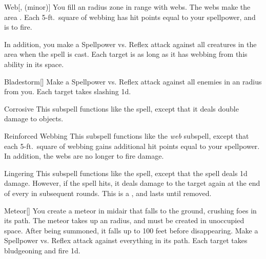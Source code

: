 \begin{ability}[\nth{2}]{Web}[,  (minor)]
You fill an \areasmall radius zone in \rngclose range with webs.
The webs make the area .
Each 5-ft.\ square of webbing has hit points equal to your spellpower, and is  to fire.

In addition, you make a Spellpower vs. Reflex attack against all creatures in the area when the spell is cast.
\hit Each target is \immobilized as long as it has webbing from this ability in its space.
\end{ability}
\vspace{0.25em}


\begin{ability}[\nth{3}]{Bladestorm}[]
Make a Spellpower vs. Reflex attack against all enemies in an \areasmall radius from you.
\hit Each target takes slashing  \minus1d.
\end{ability}
\vspace{0.25em}


\begin{ability}[\nth{3}]{Corrosive}
This subspell functions like the  spell, except that it deals double damage to objects.
\end{ability}
\vspace{0.25em}


\begin{ability}[\nth{4}]{Reinforced Webbing}
This subspell functions like the \textit{web} subspell, except that each 5-ft.\ square of webbing gains additional hit points equal to your spellpower.
In addition, the webs are no longer  to fire damage.
\end{ability}
\vspace{0.25em}


\begin{ability}[\nth{5}]{Lingering}
This subspell functions like the  spell, except that the spell deals \minus1d damage.
However, if the spell hits, it deals damage to the target again at the end of every  in subsequent rounds.
This is a , and lasts until removed.
\end{ability}
\vspace{0.25em}


\begin{ability}[\nth{5}]{Meteor}[]
You create a meteor in midair that falls to the ground, crushing foes in its path.
The meteor takes up an \areamed radius, and must be created in unoccupied space.
After being summoned, it falls up to 100 feet before disappearing.
Make a Spellpower vs. Reflex attack against everything in its path.
\hit Each target takes bludgeoning and fire  \minus1d.
\end{ability}
\vspace{0.25em}



